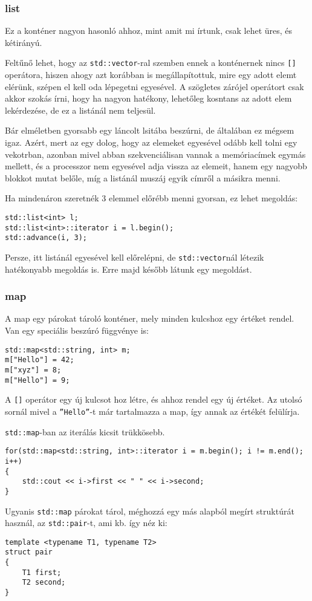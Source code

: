 \documentclass[a4paper,11.5pt]{article}
\begin{document}
	\subsubsection{list}
	Ez a konténer nagyon hasonló ahhoz, mint amit mi írtunk, csak lehet üres, és kétirányú. 
	\smallskip
	
	Feltűnő lehet, hogy az \texttt{std::vector}-ral szemben ennek a konténernek nincs \texttt{[]} operátora, hiszen ahogy azt korábban is megállapítottuk, mire egy adott elemt elérünk, szépen el kell oda lépegetni egyesével. A szögletes zárójel operátort csak akkor szokás írni, hogy ha nagyon hatékony, lehetőleg kosntans az adott elem lekérdezése, de ez a listánál nem teljesül.
	\begin{note}
		Bár elméletben gyorsabb egy láncolt lsitába beszúrni, de általában ez mégsem igaz. Azért, mert az egy dolog, hogy az elemeket egyesével odább kell tolni egy vekotrban, azonban mivel abban szekvenciálisan vannak a memóriacímek egymás mellett, és a processzor nem egyesével adja vissza az elemeit, hanem egy nagyobb blokkot mutat belőle, míg a listánál muszáj egyik címről a másikra menni.
	\end{note}
%	
	Ha mindenáron szeretnék 3 elemmel előrébb menni gyorsan, ez lehet megoldás:
\begin{lstlisting}
std::list<int> l;
std::list<int>::iterator i = l.begin();
std::advance(i, 3);
\end{lstlisting}
	Persze, itt listánál egyesével kell előrelépni, de \texttt{std::vector}nál létezik hatékonyabb megoldás is. Erre majd később látunk egy megoldást.
	\subsubsection{map}
	A map egy párokat tároló konténer, mely minden kulcshoz egy értéket rendel. Van egy speciális beszúró függvénye is:
\begin{lstlisting}
std::map<std::string, int> m;
m["Hello"] = 42;
m["xyz"] = 8;
m["Hello"] = 9;
\end{lstlisting}
	A \texttt{[]} operátor egy új kulcsot hoz létre, és ahhoz rendel egy új értéket. Az utolsó sornál mivel a \texttt{''Hello''}-t már tartalmazza a map, így annak az értékét felülírja.
	
	\medskip
	\texttt{std::map}-ban az iterálás kicsit trükkösebb.
\begin{lstlisting}
for(std::map<std::string, int>::iterator i = m.begin(); i != m.end(); i++)
{
	std::cout << i->first << " " << i->second;
}
\end{lstlisting}
	Ugyanis \texttt{std::map} párokat tárol, méghozzá egy más alapból megírt struktúrát használ, az \texttt{std::pair}-t, ami kb. így néz ki:
\begin{lstlisting}
template <typename T1, typename T2>
struct pair
{
	T1 first;
	T2 second;
}
\end{lstlisting}
\end{document}
